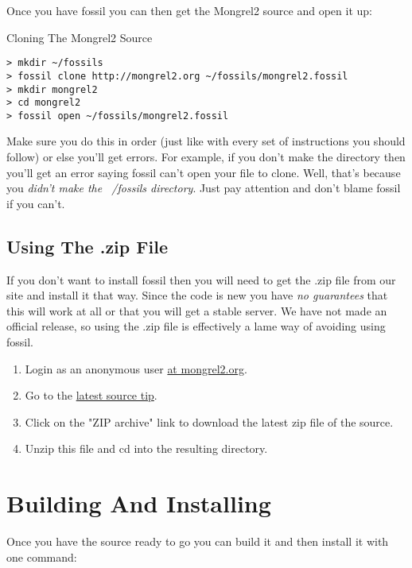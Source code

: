 Once you have fossil you can then get the Mongrel2 source and open it up:

\begin{code}{Cloning The Mongrel2 Source}
\begin{verbatim}
> mkdir ~/fossils
> fossil clone http://mongrel2.org ~/fossils/mongrel2.fossil
> mkdir mongrel2
> cd mongrel2
> fossil open ~/fossils/mongrel2.fossil
\end{verbatim}
\end{code}

Make sure you do this in order (just like with every set of instructions you should follow)
or else you'll get errors.  For example, if you don't make the  directory
then you'll get an error saying fossil can't open your file to clone.  Well, that's because
you \emph{didn't make the ~/fossils directory}.  Just pay attention and don't blame fossil
if you can't.


\subsection{Using The .zip File}

If you don't want to install fossil then you will need to get the .zip file
from our site and install it that way.  Since the code is new you have \emph{no guarantees}
that this will work at all or that you will get a stable server.  We have not made an
official release, so using the .zip file is effectively a lame way of avoiding using
fossil.

\begin{enumerate}
\item Login as an anonymous user \href{http://mongrel2.org/login}{at mongrel2.org}.
\item Go to the \href{http://mongrel2.org/info/tip}{latest source tip}.
\item Click on the "ZIP archive" link to download the latest zip file of the source.
\item Unzip this file and cd into the resulting directory.
\end{enumerate}


\section{Building And Installing}

Once you have the source ready to go you can build it and then install it with
one command:  

